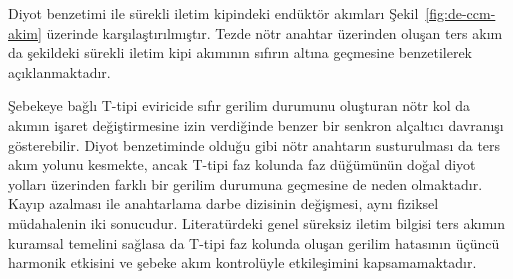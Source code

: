 Diyot benzetimi ile sürekli iletim kipindeki endüktör akımları Şekil~\ref{fig:de-ccm-akim} üzerinde karşılaştırılmıştır. Tezde nötr anahtar üzerinden oluşan ters akım da şekildeki sürekli iletim kipi akımının sıfırın altına geçmesine benzetilerek açıklanmaktadır.

Şebekeye bağlı T-tipi eviricide sıfır gerilim durumunu oluşturan nötr kol da akımın işaret değiştirmesine izin verdiğinde benzer bir senkron alçaltıcı davranışı gösterebilir. Diyot benzetiminde olduğu gibi nötr anahtarın susturulması da ters akım yolunu kesmekte, ancak T-tipi faz kolunda faz düğümünün doğal diyot yolları üzerinden farklı bir gerilim durumuna geçmesine de neden olmaktadır. Kayıp azalması ile anahtarlama darbe dizisinin değişmesi, aynı fiziksel müdahalenin iki sonucudur. Literatürdeki genel süreksiz iletim bilgisi ters akımın kuramsal temelini sağlasa da T-tipi faz kolunda oluşan gerilim hatasının üçüncü harmonik etkisini ve şebeke akım kontrolüyle etkileşimini kapsamamaktadır.

